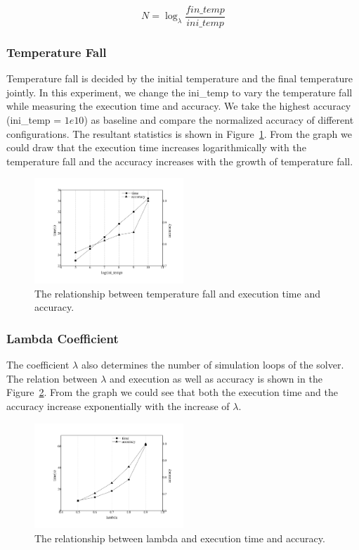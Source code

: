 \begin{equation}
\label{eq:SA_loops}
N=\log_{\lambda}\frac{fin\_temp}{ini\_temp}
\end{equation}

\subsubsection{Temperature Fall}
Temperature fall is decided by the initial temperature and the final temperature jointly. In this experiment, we change the ini\_temp to vary the temperature fall while measuring the execution time and accuracy. We take the highest accuracy (ini\_temp = $1e10$) as baseline and compare the normalized accuracy of different configurations. The resultant statistics is shown in Figure~\ref{fig:initemp}. From the graph we could draw that the execution time increases logarithmically with the temperature fall and the accuracy increases with the growth of temperature fall.


\begin{figure}[ht]
\centering
\includegraphics[width=0.50\textwidth]{graph/ini_temp.pdf}
\caption{The relationship between temperature fall and execution time and accuracy.}
\label{fig:initemp}
\end{figure}

\subsubsection{Lambda Coefficient}
The coefficient $\lambda$ also determines the number of simulation loops of the solver. The relation between $\lambda$ and execution as well as accuracy is shown in the Figure~\ref{fig:lambda}. From the graph we could see that both the execution time and the accuracy increase exponentially with the increase of $\lambda$.  

\begin{figure}[ht]
\centering
\includegraphics[width=0.50\textwidth]{graph/lambda.pdf}
\caption{The relationship between lambda and execution time and accuracy.}
\label{fig:lambda}
\end{figure} 

